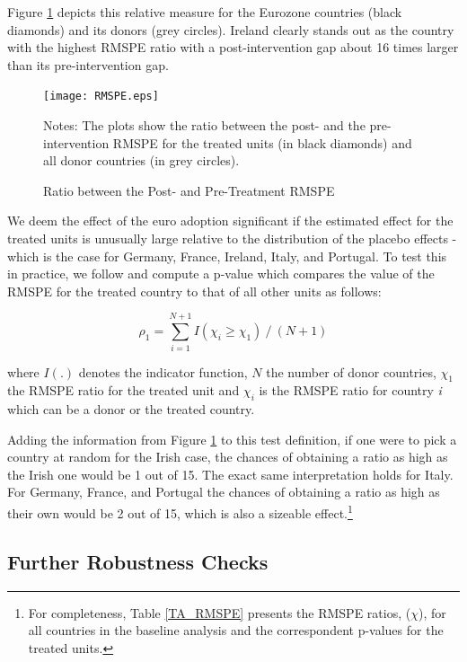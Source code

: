 \documentclass[12pt]{article}
\newcommand{\annote}[1]{\parbox{\textwidth}{\renewcommand{\baselinestretch}{1.0}\vspace{12pt} \small Notes: #1}}
\begin{document}
Figure \ref{F_RMSPE} depicts this relative measure for the Eurozone countries (black diamonds) and its donors (grey circles). Ireland clearly stands out as the country with the highest RMSPE ratio with a post-intervention gap about 16 times larger than its pre-intervention gap. 

\begin{figure}[h!]
    \centering
    \caption{\label{F_RMSPE} Ratio between the Post- and Pre-Treatment RMSPE}
    \texttt{[image: RMSPE.eps]}
    \annote{The plots show the ratio between the post- and the pre-intervention RMSPE for the treated units (in black diamonds) and all donor countries (in grey circles).}
\end{figure}

We deem the effect of the euro adoption significant if the estimated effect for the treated units is unusually large relative to the distribution of the placebo effects - which is the case for Germany, France, Ireland, Italy, and Portugal. To test this in practice, we follow \cite{Abadie2015} and compute a p-value which compares the value of the RMSPE for the treated country to that of all other units as follows:

\begin{equation}
\label{EQ_test2}
    \rho_1 = \sum\limits_{i=1}^{N+1} I(\chi_i \geq \chi_1) \ / \ (N+1)
\end{equation}

where $I(.)$ denotes the indicator function, $N$ the number of donor countries, $\chi_1$ the RMSPE ratio for the treated unit and $\chi_i$ is the RMSPE ratio for country \textit{i} which can be a donor or the treated country. 

Adding the information from Figure \ref{F_RMSPE} to this test definition, if one were to pick a country at random for the Irish case, the chances of obtaining a ratio as high as the Irish one would be 1 out of 15. The exact same interpretation holds for Italy. For Germany, France, and Portugal the chances of obtaining a ratio as high as their own would be 2 out of 15, which is also a sizeable effect.\footnote{For completeness, Table \ref{TA_RMSPE} presents the RMSPE ratios, ($\chi$), for all countries in the baseline analysis and the correspondent p-values for the treated units.}

\subsection{Further Robustness Checks} 
\end{document}
